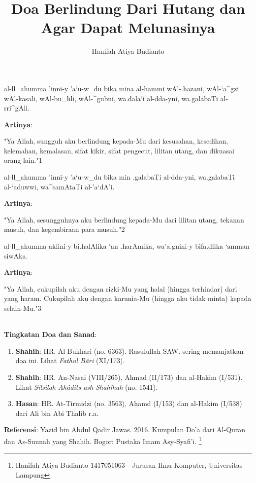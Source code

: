\documentclass[a4paper,12pt]{article}
\title{\Large Doa Berlindung Dari Hutang dan Agar Dapat Melunasinya}
\author{\calligra Hanifah Atiya Budianto}
\begin{document}
\sffamily
\maketitle 
\fullvocalize
{}
\begin{arabtext}
\noindent
al-ll_ahumma 'inni-y 'a`u-w_du bika mina al-hammi wAl-.hazani, wAl-`a^gzi 
wAl-kasali, wAl-bu_hli, wAl-^gubni, wa.dala`i al-dda-yni, wa.galabaTi 
al-rri^gAli.\\
\end{arabtext}
\noindent
\textbf{Artinya}:
\par
\indent
"Ya Allah, sungguh aku  berlindung kepada-Mu dari kesusahan, kesedihan, 
kelemahan, kemalasan, sifat kikir, sifat pengecut, lilitan utang, dan 
dikuasai orang lain."{\scriptsize 1}\\
\begin{arabtext}
\noindent
al-ll_ahumma 'inni-y 'a`u-w_du bika min .galabaTi al-dda-yni, wa.galabaTi 
al-`aduwwi, wa^samAtaTi al-'a`dA'i.\\
\end{arabtext}
\noindent
\textbf{Artinya}:
\par
\indent
"Ya Allah, sesungguhnya aku berlindung kepada-Mu dari lilitan utang, 
tekanan musuh, dan kegembiraan para musuh."{\scriptsize 2}\\
\begin{arabtext}
\noindent
al-ll_ahumma akfini-y bi.halAlika `an .harAmika, wa'a.gnini-y bifa.dlika 
`amman siwAka.\\
\end{arabtext}
\noindent
\textbf{Artinya}:
\par
\indent
"Ya Allah, cukupilah aku dengan rizki-Mu yang halal (hingga terhindar) dari
yang haram. Cukupilah aku dengan karunia-Mu (hingga aku tidak minta) kepada
selain-Mu."{\scriptsize 3}\\\\
\par
\noindent
\textbf{Tingkatan Doa dan Sanad}:
\begin{enumerate}
\item \textbf{Shahih}: HR. Al-Bukhari (no. 6363). Rasulullah SAW. sering 
memanjatkan doa ini. Lihat \textit{Fathul B\^{a}ri} (XI/173).
\item \textbf{Shahih}: HR. An-Nasai (VIII/265), Ahmad (II/173) dan al-Hakim
(I/531). Lihat \textit{Silsilah Ah\^{a}d\^{i}ts ash-Shah\^{i}hah} (no. 
1541).
\item \textbf{Hasan}: HR. At-Tirmidzi (no. 3563), Ahamd (I/153) dan 
al-Hakim (I/538) dari Ali bin Abi Thalib r.a.
\end{enumerate}
\textbf{Referensi}: Yazid bin Abdul Qadir Jawas. 2016. Kumpulan Do'a dari
Al-Quran dan As-Sunnah yang Shahih. Bogor: Pustaka Imam Asy-Syafi'i.
\footnote{Hanifah Atiya Budianto 1417051063 - Jurusan Ilmu Komputer,
Universitas Lampung}
\end{document}
